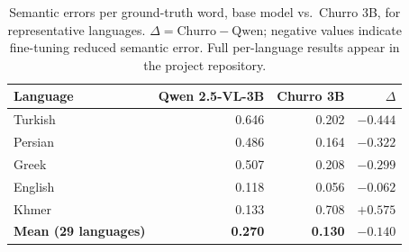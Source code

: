 \begin{table}[h]
  \centering
  \caption{Semantic errors per ground-truth word, base model vs.\ Churro 3B,
    for representative languages. $\Delta = \text{Churro} - \text{Qwen}$;
    negative values indicate fine-tuning reduced semantic error. Full
    per-language results appear in the project repository.}
  \label{tab:churro-delta}
  \begin{tabular}{lrrr}
    \toprule
    Language & Qwen 2.5-VL-3B & Churro 3B & $\Delta$ \\
    \midrule
    Turkish  & 0.646 & 0.202 & $-0.444$ \\
    Persian  & 0.486 & 0.164 & $-0.322$ \\
    Greek    & 0.507 & 0.208 & $-0.299$ \\
    English  & 0.118 & 0.056 & $-0.062$ \\
    Khmer    & 0.133 & 0.708 & $+0.575$ \\
    \midrule
    \textbf{Mean (29 languages)} & \textbf{0.270} & \textbf{0.130} & \textbf{$-0.140$} \\
    \bottomrule
  \end{tabular}
\end{table}
